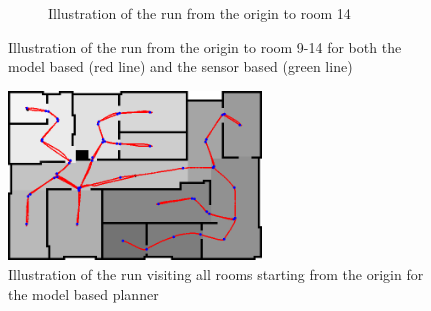 \documentclass[../Head/Main.tex]{subfiles}
\begin{document}
\begin{figure}[H]
\begin{subfigure}[b]{0.49\textwidth}
    \caption{Illustration of the run from the origin to room 14}
    \label{fig:Test14}
  \end{subfigure}
  \caption{Illustration of the run from the origin to room 9-14 for both the model based (red line) and the sensor based (green line)}
\end{figure}
\begin{figure}[H]
	\centering
	\includegraphics[width=0.6\textwidth]{brushfireTest15}
	\caption{Illustration of the run visiting all rooms starting from the origin for the model based planner}
	\label{fig:Test15}
\end{figure}
\end{document}
